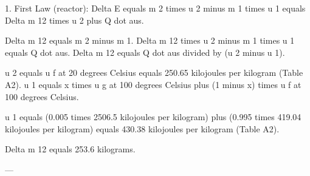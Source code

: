 1. First Law (reactor):  
Delta E equals m 2 times u 2 minus m 1 times u 1 equals Delta m 12 times u 2 plus Q dot aus.  

Delta m 12 equals m 2 minus m 1.  
Delta m 12 times u 2 minus m 1 times u 1 equals Q dot aus.  
Delta m 12 equals Q dot aus divided by (u 2 minus u 1).  

u 2 equals u f at 20 degrees Celsius equals 250.65 kilojoules per kilogram (Table A2).  
u 1 equals x times u g at 100 degrees Celsius plus (1 minus x) times u f at 100 degrees Celsius.  

u 1 equals (0.005 times 2506.5 kilojoules per kilogram) plus (0.995 times 419.04 kilojoules per kilogram) equals 430.38 kilojoules per kilogram (Table A2).  

Delta m 12 equals 253.6 kilograms.  

---